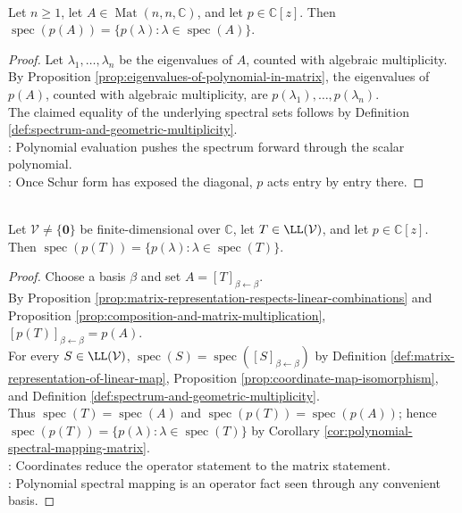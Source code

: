\begin{corollary} \label{cor:polynomial-spectral-mapping-matrix} \\
Let $n\geq1$, let $A\in\operatorname{Mat}(n,n,\mathbb{C})$, and let $p\in\mathbb{C}[z]$. Then $\operatorname{spec}(p(A))=\{p(\lambda):\lambda\in\operatorname{spec}(A)\}$.
\begin{proof}
Let $\lambda_1,\ldots,\lambda_n$ be the eigenvalues of $A$, counted with algebraic multiplicity.\\
By Proposition \ref{prop:eigenvalues-of-polynomial-in-matrix}, the eigenvalues of $p(A)$, counted with algebraic multiplicity, are $p(\lambda_1),\ldots,p(\lambda_n)$.\\
The claimed equality of the underlying spectral sets follows by Definition \ref{def:spectrum-and-geometric-multiplicity}.\\
: Polynomial evaluation pushes the spectrum forward through the scalar polynomial.\\
: Once Schur form has exposed the diagonal, $p$ acts entry by entry there.
\end{proof}
\end{corollary}

\begin{corollary} \label{cor:polynomial-spectral-mapping-operator} \\
Let $\mathcal{V}\neq\{\mathbf{0}\}$ be finite-dimensional over $\mathbb{C}$, let $T\in\LL(\mathcal{V})$, and let $p\in\mathbb{C}[z]$. Then $\operatorname{spec}(p(T))=\{p(\lambda):\lambda\in\operatorname{spec}(T)\}$.
\begin{proof}
Choose a basis $\beta$ and set $A=[T]_{\beta\leftarrow\beta}$.\\
By Proposition \ref{prop:matrix-representation-respects-linear-combinations} and Proposition \ref{prop:composition-and-matrix-multiplication}, $[p(T)]_{\beta\leftarrow\beta}=p(A)$.\\
For every $S\in\LL(\mathcal{V})$, $\operatorname{spec}(S)=\operatorname{spec}([S]_{\beta\leftarrow\beta})$ by Definition \ref{def:matrix-representation-of-linear-map}, Proposition \ref{prop:coordinate-map-isomorphism}, and Definition \ref{def:spectrum-and-geometric-multiplicity}.\\
Thus $\operatorname{spec}(T)=\operatorname{spec}(A)$ and $\operatorname{spec}(p(T))=\operatorname{spec}(p(A))$; hence $\operatorname{spec}(p(T))=\{p(\lambda):\lambda\in\operatorname{spec}(T)\}$ by Corollary \ref{cor:polynomial-spectral-mapping-matrix}.\\
: Coordinates reduce the operator statement to the matrix statement.\\
: Polynomial spectral mapping is an operator fact seen through any convenient basis.
\end{proof}
\end{corollary}

